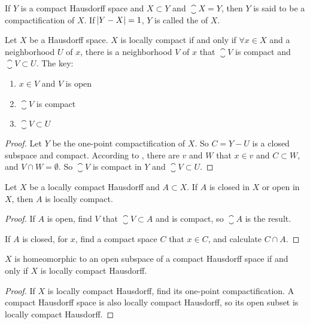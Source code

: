 \begin{definition}
    If $Y$ is a compact Hausdorff space and $X \subset Y$ and $\closure{X} = Y$, then $Y$ is said to be a compactification of $X$. If $\abs{Y - X} = 1$, $Y$ is called the  of $X$.
\end{definition}

\begin{theorem}
    Let $X$ be a Hausdorff space. $X$ is locally compact if and only if $\forall x \in X$ and a neighborhood $U$ of $x$, there is a neighborhood $V$ of $x$ that $\closure{V}$ is compact and $\closure{V} \subset U$.
    The key:
    \begin{enumerate}
        \item $x \in V$  and $V$ is open
        \item $\closure{V}$ is compact
        \item $\closure{V} \subset U$
    \end{enumerate}
\end{theorem}
\begin{proof}
    Let $Y$ be the one-point compactification of $X$. So $C = Y - U$ is a closed subspace and compact. According to , there are $v$ and $W$ that $x \in v$ and $C \subset W$, and $V \cap W = \emptyset$. So $\closure{V}$ is compact in $Y$ and $\closure{V} \subset U$.
\end{proof}

\begin{theorem}
    Let $X$ be a locally compact Hausdorff and $A \subset X$. If $A$ is closed in $X$ or open in $X$, then $A$ is locally compact.
\end{theorem}
\begin{proof}
    If $A$ is open, find $V$ that $\closure{V} \subset A$ and is compact, so $\closure{A}$ is the result. 
    
    If $A$ is closed, for $x$, find a compact space $C$ that $x \in C$, and calculate $C \cap A$.
\end{proof}

\begin{theorem}
    $X$ is homeomorphic to an open subspace of a compact Hausdorff space if and only if $X$ is locally compact Hausdorff.
\end{theorem}
\begin{proof}
    If $X$ is locally compact Hausdorff, find its one-point compactification. A compact Hausdorff space is also locally compact Hausdorff, so its open subset is locally compact Hausdorff.
\end{proof}





